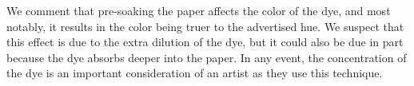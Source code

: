 \documentclass{article}
\begin{document}
We comment that pre-soaking the paper affects the color of the dye, and most notably,
it results in the color being truer to the advertised hue. We suspect that this effect is
due to the extra dilution of the dye, but it could also be due in part because the dye
absorbs deeper into the paper. In any event, the concentration of the dye is an important
consideration of an artist as they use this technique.
\end{document}
